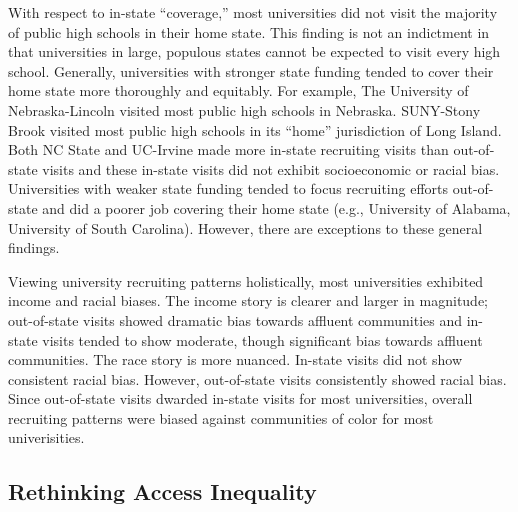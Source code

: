 \documentclass[twoside]{article}
\begin{document}
With respect to in-state ``coverage,'' most universities did not visit the majority of public high schools in their home state.  This finding is not an indictment in that universities in large, populous states cannot be expected to visit every high school. Generally, universities with stronger state funding tended to cover their home state more thoroughly and equitably. For example, The University of Nebraska-Lincoln visited most public high schools in Nebraska. SUNY-Stony Brook visited most public high schools in its ``home'' jurisdiction of Long Island. Both NC State and UC-Irvine made more in-state recruiting visits than out-of-state visits and these in-state visits did not exhibit socioeconomic or racial bias. Universities with weaker state funding tended to focus recruiting efforts out-of-state and did a poorer job covering their home state (e.g., University of Alabama, University of South Carolina). However, there are exceptions to these general findings. 

Viewing university recruiting patterns holistically, most universities exhibited income and racial biases. The income story is clearer and larger in magnitude; out-of-state visits showed dramatic bias towards affluent communities and in-state visits tended to show moderate, though significant bias towards affluent communities. The race story is more nuanced. In-state visits did not show consistent racial bias. However, out-of-state visits consistently showed racial bias. Since out-of-state visits dwarded in-state visits for most universities, overall recruiting patterns were biased against communities of color for most univerisities.

\subsection*{Rethinking Access Inequality}
\end{document}
